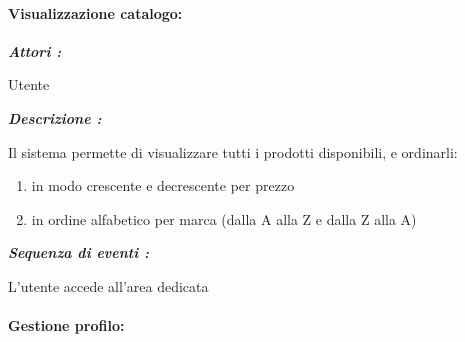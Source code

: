 \documentclass{article}
\begin{document}
\paragraph{Visualizzazione catalogo:}

\begin{mdframed}
	\noindent\textit{\textbf{Attori :}}


	Utente

	\noindent\textit{\textbf{Descrizione :}}


	Il sistema permette di visualizzare tutti i prodotti disponibili, e ordinarli:
	\begin{enumerate}
		\item in modo crescente e decrescente per prezzo
		\item in ordine alfabetico per marca (dalla A alla Z e dalla Z alla A)
	\end{enumerate}

	\noindent\textit{\textbf{Sequenza di eventi :}}


	L’utente accede all'area dedicata

\end{mdframed}

\paragraph{Gestione profilo:}
\end{document}
